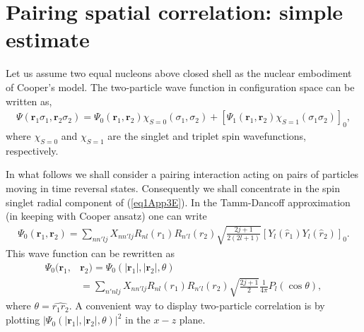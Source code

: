 \section{Pairing spatial correlation: simple estimate}\label{app3D}
Let us assume two equal nucleons above closed shell as the nuclear embodiment of Cooper's model. The two-particle wave function in configuration space can be written as,
\begin{align}\label{eq1App3E}
\Psi(\mathbf r_1\sigma_1,\mathbf r_2\sigma_2)=\Psi_0(\mathbf r_1,\mathbf r_2)\chi_{S=0}(\sigma_1,\sigma_2)+\left[\Psi_1(\mathbf r_1,\mathbf r_2)\chi_{S=1}(\sigma_1\sigma_2)\right]_0,
\end{align}
where $\chi_{S=0}$ and $\chi_{S=1}$ are the singlet and triplet spin wavefunctions, respectively.

In what follows we shall consider a pairing interaction acting on pairs of particles moving in time reversal states. Consequently we shall concentrate in the spin singlet radial component of (\ref{eq1App3E}). In the Tamm-Dancoff approximation (in keeping with Cooper ansatz) one can write
\begin{align}\label{eq2App3E}
\Psi_0(\mathbf r_1,\mathbf r_2)=\sum_{nn'lj}X_{nn'lj}R_{nl}(r_1)R_{n'l}(r_2)\sqrt{\frac{2j+1}{2(2l+1)}}\left[Y_l(\hat r_1)Y_l(\hat r_2)\right]_0.
\end{align}
This wave function can be rewritten as
\begin{align}\label{eq3App3Ex}
\nonumber\Psi_0(\mathbf r_1,&\mathbf r_2)=\Psi_0(|\mathbf r_1|,|\mathbf r_2|,\theta)\\
&=\sum_{n'nlj}X_{nn'lj}R_{nl}(r_1)R_{n'l}(r_2)\sqrt{\frac{2j+1}{2}}\frac{1}{4\pi}P_l(\cos\theta),
\end{align}
where $\theta=\widehat{r_1r_2}$. A convenient way to display two-particle correlation is by plotting $|\Psi_0(|\mathbf r_1|,|\mathbf r_2|,\theta)|^2$ in the $x-z$ plane.





